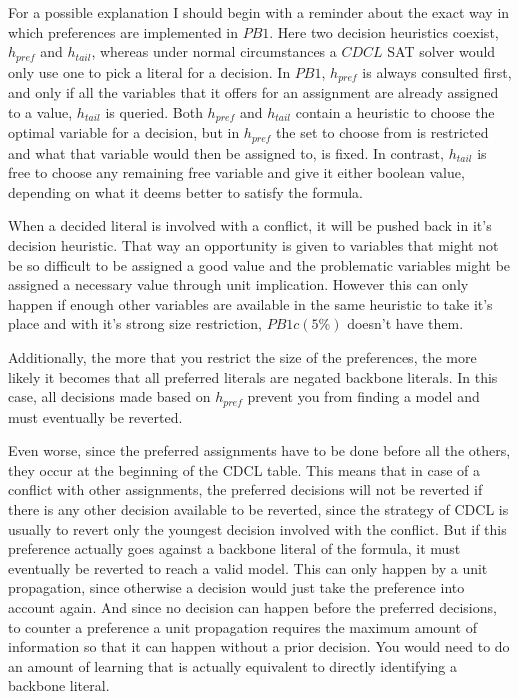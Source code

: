 
For a possible explanation I should begin with a reminder about the exact way in which preferences are implemented in $PB1$. Here two decision heuristics coexist, $h_{pref}$ and $h_{tail}$, whereas under normal circumstances a $CDCL$ SAT solver would only use one to pick a literal for a decision. In $PB1$, $h_{pref}$ is always consulted first, and only if all the variables that it offers for an assignment are already assigned to a value, $h_{tail}$ is queried. Both $h_{pref}$ and $h_{tail}$ contain a heuristic to choose the optimal variable for a decision, but in $h_{pref}$ the set to choose from is restricted and what that variable would then be assigned to, is fixed. In contrast, $h_{tail}$ is free to choose any remaining free variable and give it either boolean value, depending on what it deems better to satisfy the formula.

When a decided literal is involved with a conflict, it will be pushed back in it's decision heuristic. That way an opportunity is given to variables that might not be so difficult to be assigned a good value and the problematic variables might be assigned a necessary value through unit implication. 
However this can only happen if enough other variables are available in the same heuristic to take it's place and with it's strong size restriction, $PB1c(5\%)$ doesn't have them.

Additionally, the more that you restrict the size of the preferences, the more likely it becomes that all preferred literals are negated backbone literals. In this case, all decisions made based on $h_{pref}$ prevent you from finding a model and must eventually be reverted.

Even worse, since the preferred assignments have to be done before all the others, they occur at the beginning of the CDCL table. This means that in case of a conflict with other assignments, the preferred decisions will not be reverted if there is any other decision available to be reverted, since the strategy of CDCL is usually to revert only the youngest decision involved with the conflict. But if this preference actually goes against a backbone literal of the formula, it must eventually be reverted to reach a valid model. This can only happen by a unit propagation, since otherwise a decision would just take the preference into account again. And since no decision can happen before the preferred decisions, to counter a preference a unit propagation requires the maximum amount of information so that it can happen without a prior decision. You would need to do an amount of learning that is actually equivalent to directly identifying a backbone literal. 

